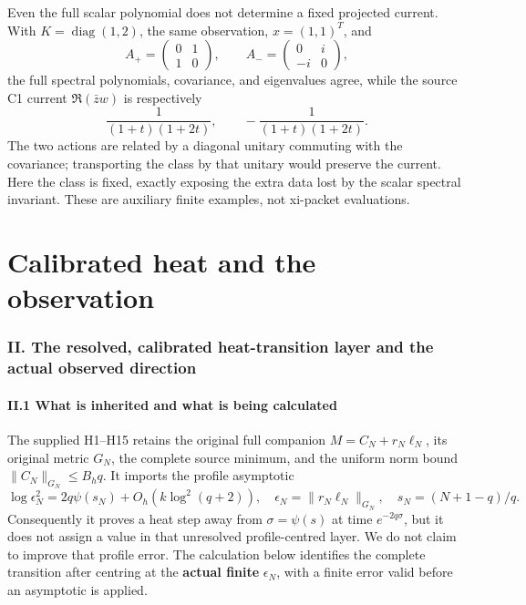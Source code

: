 \documentclass[11pt]{article}
\begin{document}
Even the full scalar polynomial does not determine a fixed projected current. With \(K=\operatorname{diag}(1,2)\), the same observation, \(x=(1,1)^T\), and \[
 A_+=\begin{pmatrix}0&1\\1&0\end{pmatrix},\qquad
 A_-=\begin{pmatrix}0&i\\-i&0\end{pmatrix},
\] the full spectral polynomials, covariance, and eigenvalues agree, while the source C1 current \(\Re(\bar z w)\) is respectively \[
 \frac{1}{(1+t)(1+2t)},\qquad -\frac{1}{(1+t)(1+2t)}.
 \tag{D15}
\] The two actions are related by a diagonal unitary commuting with the covariance; transporting the class by that unitary would preserve the current. Here the class is fixed, exactly exposing the extra data lost by the scalar spectral invariant. These are auxiliary finite examples, not xi-packet evaluations.

\clearpage\part{Calibrated heat and the observation}
\label{part:10}
\section{II. The resolved, calibrated heat-transition layer and the actual observed direction}\label{ii.-the-resolved-calibrated-heat-transition-layer-and-the-actual-observed-direction}

\subsection{II.1 What is inherited and what is being calculated}\label{ii.1-what-is-inherited-and-what-is-being-calculated}

The supplied H1--H15 retains the original full companion \(M=C_N+r_N\ell_N\), its original metric \(G_N\), the complete source minimum, and the uniform norm bound \(\|C_N\|_{G_N}\le B_hq\). It imports the profile asymptotic \[
 \log\epsilon_N^2=2q\psi(s_N)+O_h(k\log^2(q+2)),\quad
 \epsilon_N=\|r_N\ell_N\|_{G_N},\quad s_N=(N+1-q)/q.
\] Consequently it proves a heat step away from \(\sigma=\psi(s)\) at time \(e^{-2q\sigma}\), but it does not assign a value in that unresolved profile-centred layer. We do not claim to improve that profile error. The calculation below identifies the complete transition after centring at the \textbf{actual finite} \(\epsilon_N\), with a finite error valid before an asymptotic is applied.
\end{document}
